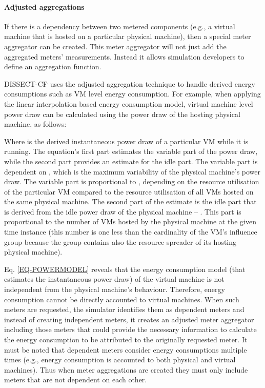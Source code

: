\documentclass[sort, compress, 5p]{elsarticle}
\begin{document}
\paragraph{Adjusted aggregations} If there is a dependency between two metered components (e.g., a virtual machine that is hosted on a particular physical machine), then a special meter aggregator can be created. This meter aggregator will not just add the aggregated meters' measurements. Instead it allows simulation developers to define an aggregation function.

DISSECT-CF uses the adjusted aggregation technique to handle derived energy consumptions such as VM level energy consumption. For example, when applying the linear interpolation based energy consumption model, virtual machine level power draw can be calculated using the power draw of the hosting physical machine, as follows:

Where  is the derived instantaneous power draw of a particular VM while it is running. The equation's first part estimates the variable part of the power draw, while the second part provides an estimate for the idle part. The variable part is dependent on , which is the maximum variability of the physical machine's power draw. The variable part is proportional to , depending on the resource utilisation of the particular VM compared to the resource utilisation of all VMs hosted on the same physical machine. The second part of the estimate is the idle part that is derived from the idle power draw of the physical machine -- . This part is proportional to the number of VMs hosted by the physical machine at the given time instance (this number is one less than the cardinality of the VM's influence group because the group contains also the resource spreader of its hosting physical machine).

Eq. \ref{EQ-POWERMODEL} reveals that the energy consumption model (that estimates the instantaneous power draw) of the virtual machine is not independent from the physical machine's behaviour. Therefore, energy consumption cannot be directly accounted to virtual machines. When such meters are requested, the simulator identifies them as dependent meters and instead of creating independent meters, it creates an adjusted meter aggregator including those meters that could provide the necessary information to calculate the energy consumption to be attributed to the originally requested meter. It must be noted that dependent meters consider energy consumptions multiple times (e.g., energy consumption is accounted to both physical and virtual machines). Thus when meter aggregations are created they must only include meters that are not dependent on each other.
\end{document}

